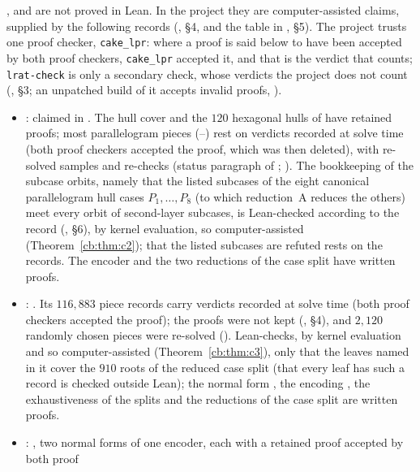 \begin{remark}\label{mb:rem:main3}
,  and  are not proved in Lean. In the project they are
computer-assisted claims, supplied by the following records (, \S4, and the table in
, \S5). The project trusts one proof checker, \texttt{cake\_lpr}: where a proof is said below to
have been accepted by both proof checkers, \texttt{cake\_lpr} accepted it, and that is the verdict that counts;
\texttt{lrat-check} is only a secondary check, whose verdicts the project does not count (,
\S3; an unpatched build of it accepts invalid proofs, ).
\begin{itemize}
\item {}: claimed in . The hull cover and the $120$ hexagonal hulls of  have
  retained proofs; most parallelogram pieces (--) rest on verdicts recorded at solve time (both
  proof checkers accepted the proof, which was then deleted), with re-solved samples and re-checks (status paragraph
  of ; ). The bookkeeping of the subcase orbits, namely that the listed
  subcases of the eight canonical parallelogram hull cases $P_1,\dots,P_8$ (to which reduction~A reduces the others)
  meet every orbit of second-layer subcases, is Lean-checked according to the record (,
  \S6), by kernel evaluation, so computer-assisted (Theorem~\ref{cb:thm:c2}); that the listed subcases are refuted
  rests on the records. The encoder and the two reductions of the case split have written proofs.
\item {}: . Its $116{,}883$ piece records carry verdicts recorded at solve time (both
  proof checkers accepted the proof); the proofs were not kept (, \S4), and $2{,}120$ randomly
  chosen pieces were re-solved ().  Lean-checks, by kernel evaluation and so
  computer-assisted (Theorem~\ref{cb:thm:c3}), only that the leaves named in it cover the $910$ roots of the reduced
  case split (that every leaf has such a record is checked outside Lean); the normal form
  , the encoding , the exhaustiveness of the splits and the reductions of the case
  split are written proofs.
\item {}: , two normal forms of one encoder, each with a retained proof accepted by both proof

\end{itemize}
\end{remark}
